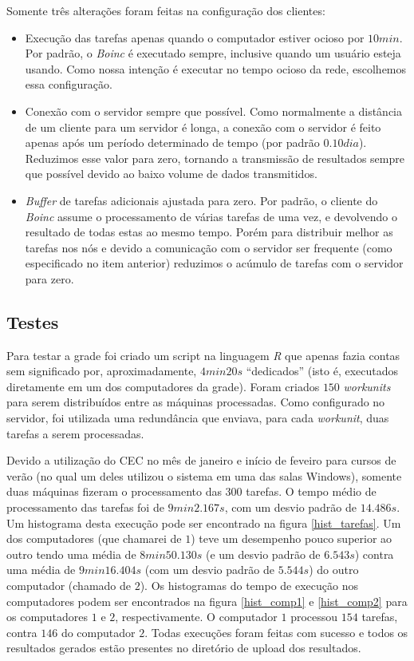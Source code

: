 Somente três alterações foram feitas na configuração dos clientes: 


\begin{itemize}
   \item Execução das tarefas apenas quando o computador estiver ocioso por $10min$. Por padrão, o \textit{Boinc} é 
executado sempre, inclusive quando um usuário esteja usando. Como nossa intenção é executar no tempo ocioso da rede, 
escolhemos essa configuração. 
   \item Conexão com o servidor sempre que possível. Como normalmente a distância de um cliente para um servidor é longa,
a conexão com o servidor é feito apenas após um período determinado de tempo (por padrão $0.10 dia$). Reduzimos 
esse valor para zero, tornando a transmissão de resultados sempre que possível devido ao baixo volume de dados transmitidos. 
   \item \emph{Buffer} de tarefas adicionais ajustada para zero. Por padrão, o cliente do \textit{Boinc} assume o processamento de várias
tarefas de uma vez, e devolvendo o resultado de todas estas ao mesmo tempo. Porém para distribuir melhor as
tarefas nos nós e devido a comunicação com o servidor ser frequente (como especificado no item anterior)
reduzimos o acúmulo de tarefas com o servidor para zero.
\end{itemize} 


\subsection{Testes}

Para testar a grade foi criado um script na linguagem \emph{R} que apenas fazia contas sem significado 
por, aproximadamente, $4min20s$ ``dedicados'' (isto é, executados diretamente em um dos computadores da grade). Foram criados 
$150$ \textit{workunits} para serem distribuídos entre as máquinas  processadas. Como
configurado no servidor, foi utilizada uma redundância que enviava, 
para cada \textit{workunit}, duas tarefas a serem processadas.

Devido a utilização do CEC no mês de janeiro e início de feveiro para cursos de verão (no qual um deles utilizou o sistema em uma das salas Windows), somente duas máquinas fizeram o processamento das $300$ tarefas. O tempo médio 
de processamento das tarefas foi de $9min2.167s$, com um desvio padrão de $14.486s$. Um histograma desta execução pode 
ser encontrado na figura \ref{hist_tarefas}. Um dos computadores (que chamarei de $1$) teve um desempenho pouco superior ao outro tendo uma
média de $8min50.130s$ (e um desvio padrão de $6.543s$) contra uma média de $9min16.404s$ (com um desvio padrão de $5.544s$) do outro computador (chamado de $2$). Os histogramas do tempo de execução nos computadores podem ser encontrados na figura \ref{hist_comp1} e \ref{hist_comp2} para os computadores $1$ e $2$, respectivamente. O computador $1$ processou $154$ tarefas, contra $146$ do computador $2$. Todas 
execuções foram feitas com sucesso e todos os resultados gerados estão presentes no diretório de upload dos resultados. 

